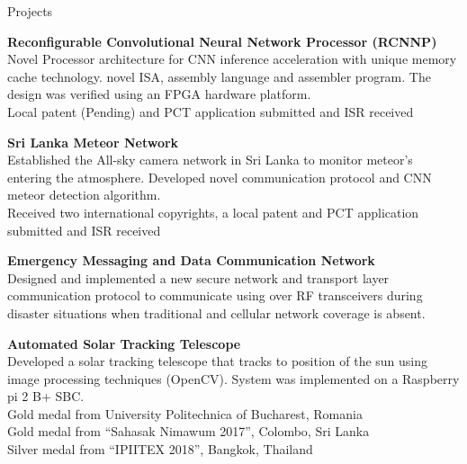 \documentclass[
	11pt, %
]{./assets/resume} %
\begin{document}

\begin{rSection}{Projects}

	\textbf{Reconfigurable Convolutional Neural Network Processor (RCNNP)} \\
	Novel Processor architecture for CNN inference acceleration with unique memory cache technology. novel ISA, assembly language and assembler program. The design was verified using an FPGA hardware platform. \\ 
	Local patent (Pending) and PCT application submitted and ISR received 


	\textbf{Sri Lanka Meteor Network} \\
	Established the All-sky camera network in Sri Lanka to monitor meteor's entering the atmosphere.
	Developed novel communication protocol and CNN meteor detection algorithm.\\
	Received two international copyrights, a local patent and PCT application submitted and ISR received 

	\textbf{Emergency Messaging and Data Communication Network} \\
	Designed and implemented a new secure network and transport layer communication protocol to communicate using over RF transceivers during disaster situations when traditional and cellular network coverage is absent.

	\textbf{Automated Solar Tracking Telescope} \\
	Developed a solar tracking telescope that tracks to position of the sun using image processing techniques (OpenCV). System was implemented on a Raspberry pi 2 B+ SBC. \\
	Gold medal from University Politechnica of Bucharest, Romania \\
	Gold medal from “Sahasak Nimawum 2017”, Colombo, Sri Lanka \\
	Silver medal from “IPIITEX 2018”, Bangkok, Thailand

\end{rSection}


\end{document}
